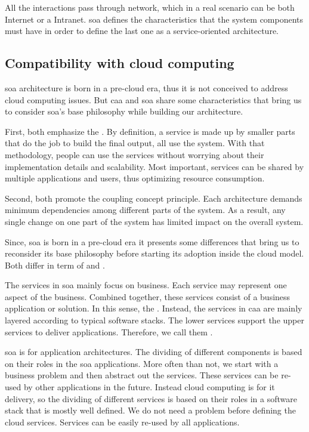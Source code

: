 All the interactions pass through network, which in a real scenario can be both Internet or a Intranet.
\ac{soa} defines the characteristics that the system components must have in order to
define the last one as a service-oriented architecture.

\subsection{Compatibility with cloud computing}
\label{sec:architecture-soa-compatibility}
\ac{soa} architecture is born in a pre-cloud era, thus it is not conceived to address cloud computing
issues. But \ac{caa} and \ac{soa} share some characteristics that bring us to consider \ac{soa}'s base
philosophy while building our architecture.

First, both emphasize the . By definition, a service is made up by smaller parts
that do the job to build the final output, all use the  system. With that methodology,
people can use the services without worrying about their implementation details and scalability. Most
important, services can be shared by multiple applications and users, thus optimizing resource consumption.

Second, both promote the  coupling concept principle. Each architecture demands minimum
dependencies among different parts of the system. As a result, any single change on one part of the system
has limited impact on the overall system.

Since, \ac{soa} is born in a pre-cloud era it presents some differences that bring us to reconsider its
base philosophy before starting its adoption inside the cloud model. Both differ in term of
 and .

The services in \ac{soa} mainly focus on business. Each service may represent one aspect of the business.
Combined together, these services consist of a business application or solution. In this sense, the 
. Instead, the services in \ac{caa} are mainly layered according to 
typical software stacks. The lower services support the upper services to deliver applications. Therefore,
we call them .

\ac{soa} is for application architectures. The dividing of different components is based on their roles in
the \ac{soa} applications. More often than not, we start with a business problem and then abstract out the
services. These services can be re-used by other applications in the future. Instead cloud computing is for
\acs{it} delivery, so the dividing of different services is based on their roles in a software stack that is
mostly well defined. We do not need a problem before defining the cloud services. Services can be easily
re-used by all applications.

